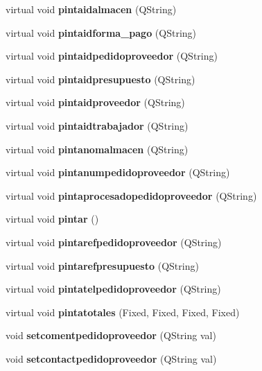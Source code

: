 \begin{CompactItemize}
\item 
virtual void {\bf pintaidalmacen} (QString)\label{classPedidoProveedor_a14}

\item 
virtual void {\bf pintaidforma\_\-pago} (QString)\label{classPedidoProveedor_a15}

\item 
virtual void {\bf pintaidpedidoproveedor} (QString)\label{classPedidoProveedor_a16}

\item 
virtual void {\bf pintaidpresupuesto} (QString)\label{classPedidoProveedor_a17}

\item 
virtual void {\bf pintaidproveedor} (QString)\label{classPedidoProveedor_a18}

\item 
virtual void {\bf pintaidtrabajador} (QString)\label{classPedidoProveedor_a19}

\item 
virtual void {\bf pintanomalmacen} (QString)\label{classPedidoProveedor_a20}

\item 
virtual void {\bf pintanumpedidoproveedor} (QString)\label{classPedidoProveedor_a21}

\item 
virtual void {\bf pintaprocesadopedidoproveedor} (QString)\label{classPedidoProveedor_a22}

\item 
virtual void {\bf pintar} ()
\item 
virtual void {\bf pintarefpedidoproveedor} (QString)\label{classPedidoProveedor_a24}

\item 
virtual void {\bf pintarefpresupuesto} (QString)\label{classPedidoProveedor_a25}

\item 
virtual void {\bf pintatelpedidoproveedor} (QString)\label{classPedidoProveedor_a26}

\item 
virtual void {\bf pintatotales} (Fixed, Fixed, Fixed, Fixed)\label{classPedidoProveedor_a27}

\item 
void {\bf setcomentpedidoproveedor} (QString val)\label{classPedidoProveedor_a28}

\item 
void {\bf setcontactpedidoproveedor} (QString val)\label{classPedidoProveedor_a29}


\end{CompactItemize}
